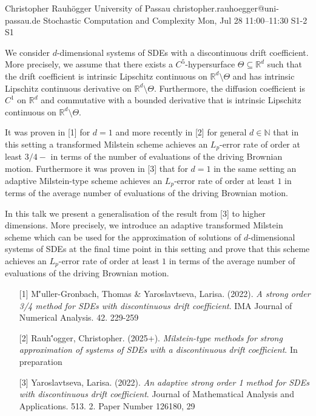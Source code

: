 \begin{talk}
  {Christopher Rauh\"ogger}%
  {University of Passau}%
  {christopher.rauhoegger@uni-passau.de}%
  {Stochastic Computation and Complexity}%
  {}%
  {}%
  {Mon, Jul 28 11:00–11:30}%
  {S1-2}%
  {S1}%
				
			
We consider $d$-dimensional systems of SDEs with a discontinuous drift coefficient. More precisely,
we assume that there exists a $C^{5}$-hypersurface
$\Theta\subseteq \mathbb{R}^{d}$ such that the drift coefficient is intrinsic Lipschitz continuous on $\mathbb{R}^{d}\setminus \Theta$ and has intrinsic Lipschitz continuous derivative on $\mathbb{R}^{d}\setminus \Theta$.
Furthermore, the diffusion coefficient is $C^{1}$ on $\mathbb{R}^{d}$ and commutative with a bounded derivative that is intrinsic Lipschitz continuous on $\mathbb{R}^{d}\setminus \Theta$.

It was proven in [1] for $d = 1$ and more recently in [2] for general $d \in \mathbb{N}$ that in this setting a transformed Milstein scheme achieves an $L_{p}$-error rate of order at least $3/4-$ in terms of the number of evaluations of the
driving Brownian motion.
Furthermore it was proven in [3] that for $d = 1$ in the same setting an adaptive Milstein-type scheme achieves an $L_{p}$-error rate of order at least $1$ in terms of the average number of evaluations of the driving Brownian motion. 

In this talk we present a generalisation of the result from [3] to higher dimensions. More precisely, we introduce an adaptive transformed Milstein scheme which can be used for the approximation of solutions of $d$-dimensional systems of SDEs at the final time point in this setting and
prove that this scheme achieves an $L_{p}$-error rate of order at least $1$ in terms of the average number of evaluations of the
driving Brownian motion.

\medskip

\begin{enumerate}
	\item[{[1]}] M\''{u}ller-Gronbach, Thomas \& Yaroslavtseva, Larisa. (2022). {\it A strong order 3/4 method for {SDE}s with discontinuous drift
		coefficient}. IMA Journal of Numerical Analysis. 42. 229-259
	\item[{[2]}] Rauh\''ogger, Christopher. (2025+). {\it Milstein-type methods for strong approximation of systems of SDEs with a discontinuous drift coefficient}. In preparation
	\item[{[3]}] Yaroslavtseva, Larisa. (2022). {\it An adaptive strong order 1 method for {SDE}s with
		discontinuous drift coefficient}. Journal of Mathematical Analysis and Applications. 513. 2. Paper Number 126180, 29
\end{enumerate}

\end{talk}

